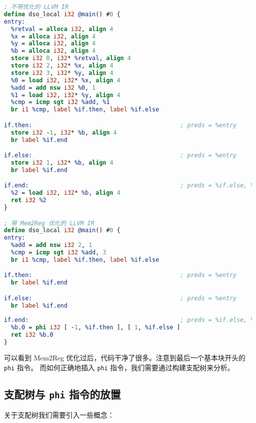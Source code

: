 \begin{lstlisting}[language=LLVM]
; 不带优化的 LLVM IR
define dso_local i32 @main() #0 {
entry:
  %retval = alloca i32, align 4
  %x = alloca i32, align 4
  %y = alloca i32, align 4
  %b = alloca i32, align 4
  store i32 0, i32* %retval, align 4
  store i32 2, i32* %x, align 4
  store i32 3, i32* %y, align 4
  %0 = load i32, i32* %x, align 4
  %add = add nsw i32 %0, 1
  %1 = load i32, i32* %y, align 4
  %cmp = icmp sgt i32 %add, %1
  br i1 %cmp, label %if.then, label %if.else

if.then:                                          ; preds = %entry
  store i32 -1, i32* %b, align 4
  br label %if.end

if.else:                                          ; preds = %entry
  store i32 1, i32* %b, align 4
  br label %if.end

if.end:                                           ; preds = %if.else, %if.then
  %2 = load i32, i32* %b, align 4
  ret i32 %2
}

; 带 Mem2Reg 优化的 LLVM IR
define dso_local i32 @main() #0 {
entry:
  %add = add nsw i32 2, 1
  %cmp = icmp sgt i32 %add, 3
  br i1 %cmp, label %if.then, label %if.else

if.then:                                          ; preds = %entry
  br label %if.end

if.else:                                          ; preds = %entry
  br label %if.end
    
if.end:                                           ; preds = %if.else, %if.then
  %b.0 = phi i32 [ -1, %if.then ], [ 1, %if.else ]
  ret i32 %b.0
}
\end{lstlisting}
可以看到 Mem2Reg 优化过后，代码干净了很多。注意到最后一个基本块开头的 \texttt{phi} 指令。
而如何正确地插入 \texttt{phi} 指令，我们需要通过构建支配树来分析。

\subsection{支配树与 \texttt{phi} 指令的放置}

关于支配树我们需要引入一些概念：


